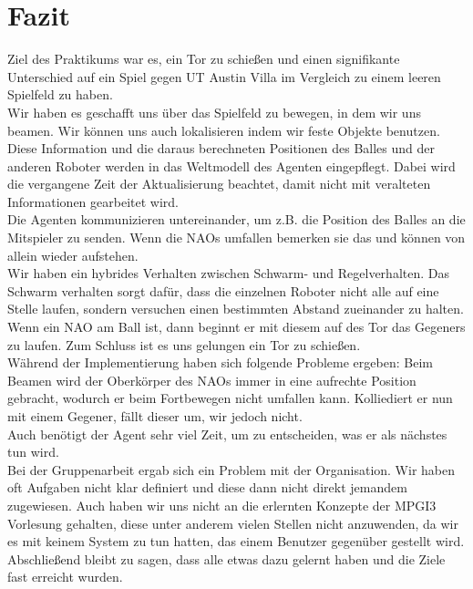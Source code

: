 \section{Fazit}

Ziel des Praktikums war es, ein Tor zu schießen und einen signifikante Unterschied auf ein Spiel gegen UT Austin Villa im Vergleich zu einem leeren Spielfeld zu haben.\\
Wir haben es geschafft uns über das Spielfeld zu bewegen, in dem wir uns beamen. Wir können uns auch lokalisieren indem wir feste Objekte benutzen. Diese Information und die daraus berechneten Positionen des Balles und der anderen Roboter werden in das Weltmodell des Agenten eingepflegt. Dabei wird die vergangene Zeit der Aktualisierung beachtet, damit nicht mit veralteten Informationen gearbeitet wird.\\
Die Agenten kommunizieren untereinander, um z.B. die Position des Balles an die Mitspieler zu senden. Wenn die NAOs umfallen bemerken sie das und können von allein wieder aufstehen.\\
Wir haben ein hybrides Verhalten zwischen Schwarm- und Regelverhalten. Das Schwarm verhalten sorgt dafür, dass die einzelnen Roboter nicht alle auf eine Stelle laufen, sondern versuchen einen bestimmten Abstand zueinander zu halten. Wenn ein NAO am Ball ist, dann beginnt er mit diesem auf des Tor das Gegeners zu laufen. Zum Schluss ist es uns gelungen ein Tor zu schießen.\\
Während der Implementierung haben sich folgende Probleme ergeben: Beim Beamen wird der Oberkörper des NAOs immer in eine aufrechte Position gebracht, wodurch er beim Fortbewegen nicht umfallen kann. Kolliediert er nun mit einem Gegener, fällt dieser um, wir jedoch nicht.\\
Auch benötigt der Agent sehr viel Zeit, um zu entscheiden, was er als nächstes tun wird.\\
Bei der Gruppenarbeit ergab sich ein Problem mit der Organisation. Wir haben oft Aufgaben nicht klar definiert und diese dann nicht direkt jemandem zugewiesen. Auch haben wir uns nicht an die erlernten Konzepte der MPGI3 Vorlesung gehalten, diese unter anderem vielen Stellen nicht anzuwenden, da wir es mit keinem System zu tun hatten, das einem Benutzer gegenüber gestellt wird.\\
Abschließend bleibt zu sagen, dass alle etwas dazu gelernt haben und die Ziele fast erreicht wurden.